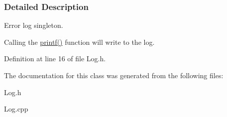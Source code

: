 \subsubsection{Detailed Description}
Error log singleton. 

Calling the \hyperlink{classLogger_a97d14a6dbc7c4490cbe590a0925bc42d}{printf()} function will write to the log. 

Definition at line 16 of file Log.h.



The documentation for this class was generated from the following files:\begin{DoxyCompactItemize}
\item 
Log.h\item 
Log.cpp\end{DoxyCompactItemize}
